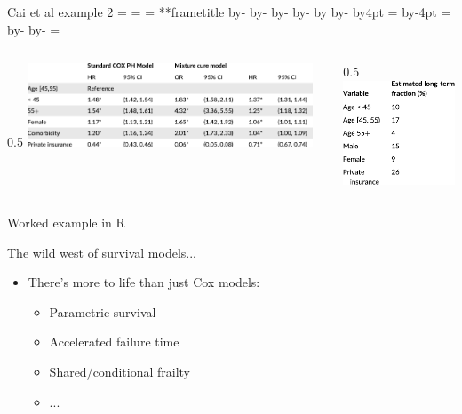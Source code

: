 \documentclass[aspectratio=169,12pt]{beamer} %
\makeatletter
\newif\ifsidebartheme
\newcommand*{\calculatespace}{%
    \contentheight=\paperheight%
    \ifx\beamer@frametitle\@empty%
        \setbox\@tempboxa=\box\voidb@x%
      \else%
        \setbox\@tempboxa=\vbox{%
          \vbox{}%
          {\parskip0pt\usebeamertemplate***{frametitle}}%
        }%
        \ifsidebartheme%
          \advance\contentheight by-1em%
        \fi%
      \fi%
    \advance\contentheight by-\ht\@tempboxa%
    \advance\contentheight by-\dp\@tempboxa%
    \advance\contentheight by-\beamer@frametopskip%
    \ifbeamer@plainframe%
    \contentbottom=0pt%
    \else%
    \advance\contentheight by-\headheight%
    \advance\contentheight by\headdp%
    \advance\contentheight by-\footheight%
    \advance\contentheight by4pt%
    \contentbottom=\footheight%
    \advance\contentbottom by-4pt%
    \fi%
    \contentwidth=\paperwidth%
    \ifbeamer@plainframe%
    \contentleft=0pt%
    \else%
    \advance\contentwidth by-\beamer@rightsidebar%
    \advance\contentwidth by-\beamer@leftsidebar\relax%
    \contentleft=\beamer@leftsidebar%
    \fi%
}
\makeatother
\begin{document}
\begin{frame}{Cai et al example 2}
\calculatespace%
\begin{columns}
\begin{column}{0.5\contentwidth}
  \centering
  \includegraphics[width=0.9\textwidth]{ref/cai_tab2.pdf}
\end{column}
\begin{column}{0.5\contentwidth}
  \centering
  \includegraphics[height=0.6\textheight]{ref/cai_tab3.pdf}
\end{column}
\end{columns}
\end{frame}

\begin{frame}{Worked example in R}
\end{frame}

\begin{frame}{The wild west of survival models...}
	\begin{itemize}
		\item There's more to life than just Cox models:
			\begin{itemize}
				\item Parametric survival
				\item Accelerated failure time
				\item Shared/conditional frailty
				\item ...
			\end{itemize}
	\end{itemize}
\end{frame}
\end{document}
